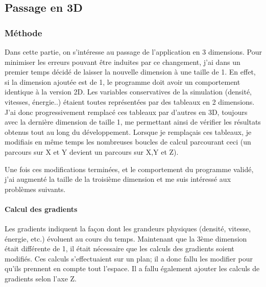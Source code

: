 \subsection{Passage en 3D}

\subsubsection{Méthode}\label{sec:3dmeth}
Dans cette partie, on s'intéresse au passage de l'application en 3 dimensions. Pour minimiser les erreurs pouvant être induites par ce changement, j'ai dans un premier temps décidé de laisser la nouvelle dimension à une taille de 1. En effet, si la dimension ajoutée est de 1, le programme doit avoir un comportement identique à la version 2D. Les variables conservatives de la simulation (densité, vitesses, énergie..) étaient toutes représentées par des tableaux en 2 dimensions. J'ai donc progressivement remplacé ces tableaux par d'autres en 3D, toujours avec la dernière dimension de taille 1,  me permettant ainsi de vérifier les résultats obtenus tout au long du développement. Lorsque je remplaçais ces tableaux, je modifiais en même temps les nombreuses boucles de calcul parcourant ceci (un parcours sur X et Y devient un parcours sur X,Y et Z). 

Une fois ces modifications terminées, et le comportement du programme validé, j'ai augmenté la taille de la troisième dimension et me suis intéressé aux problèmes suivants.




\paragraph{Calcul des gradients}Les gradients indiquent la façon dont les grandeurs physiques (densité, vitesse, énergie, etc.) évoluent au cours du temps. Maintenant que la 3ème dimension était différente de 1, il était nécessaire que les calculs des gradients soient modifiés. Ces calculs s'effectuaient sur un plan; il a donc fallu les modifier pour qu'ils prennent en compte tout l'espace. Il a fallu également ajouter les calculs de gradients selon l'axe Z.


